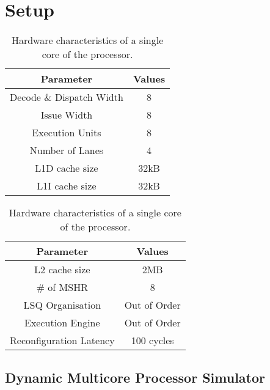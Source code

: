 \chapter{Setup}\label{chp:setup}

\begin{table}[ht]
\begin{minipage}{0.5\textwidth}
\begin{singlespace}
\begin{tabular} { cc }
      \toprule
      \textbf{Parameter} & \textbf{Values} \\ \midrule
	  Decode \& Dispatch Width & 8  \\
	  Issue Width & 8  \\
	  Execution Units & 8 \\
	  Number of Lanes & 4 \\
      L1D cache size & 32kB \\
      L1I cache size & 32kB \\
	  
	  \end{tabular}
	  \end{singlespace}
\end{minipage}\hfill
\begin{minipage}{0.5\textwidth}
\begin{singlespace}
\begin{tabular} {cc }
      \toprule
      \textbf{Parameter} & \textbf{Values} \\ \midrule
L2 cache size & 2MB \\
	  \# of MSHR & 8 \\
	  LSQ Organisation & Out of Order \\
	  Execution Engine & Out of Order \\
	  Reconfiguration Latency & 100 cycles\\
	  
	  \end{tabular}
	  \end{singlespace}
\end{minipage}
\caption{Hardware characteristics of a single core of the processor.}\label{tab:processor}
\vspace{-3em}
\end{table}

\section{Dynamic Multicore Processor Simulator}\label{chp:setup:conf}

